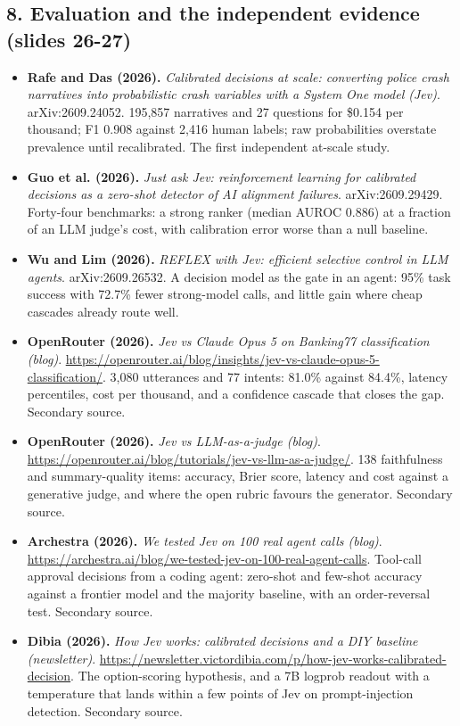 \documentclass[11pt,letterpaper]{article}
\begin{document}
\subsection*{8. Evaluation and the independent evidence (slides 26-27)}
\begin{itemize}[leftmargin=1.2em,itemsep=3pt]\sloppy
\item \textbf{Rafe and Das (2026).} \textit{Calibrated decisions at scale: converting police crash narratives into probabilistic crash variables with a System One model (Jev)}. arXiv:2609.24052. 195,857 narratives and 27 questions for \$0.154 per thousand; F1 0.908 against 2,416 human labels; raw probabilities overstate prevalence until recalibrated. The first independent at-scale study.
\item \textbf{Guo et al. (2026).} \textit{Just ask Jev: reinforcement learning for calibrated decisions as a zero-shot detector of AI alignment failures}. arXiv:2609.29429. Forty-four benchmarks: a strong ranker (median AUROC 0.886) at a fraction of an LLM judge's cost, with calibration error worse than a null baseline.
\item \textbf{Wu and Lim (2026).} \textit{REFLEX with Jev: efficient selective control in LLM agents}. arXiv:2609.26532. A decision model as the gate in an agent: 95\% task success with 72.7\% fewer strong-model calls, and little gain where cheap cascades already route well.
\item \textbf{OpenRouter (2026).} \textit{Jev vs Claude Opus 5 on Banking77 classification (blog)}. \url{https://openrouter.ai/blog/insights/jev-vs-claude-opus-5-classification/}. 3,080 utterances and 77 intents: 81.0\% against 84.4\%, latency percentiles, cost per thousand, and a confidence cascade that closes the gap. Secondary source.
\item \textbf{OpenRouter (2026).} \textit{Jev vs LLM-as-a-judge (blog)}. \url{https://openrouter.ai/blog/tutorials/jev-vs-llm-as-a-judge/}. 138 faithfulness and summary-quality items: accuracy, Brier score, latency and cost against a generative judge, and where the open rubric favours the generator. Secondary source.
\item \textbf{Archestra (2026).} \textit{We tested Jev on 100 real agent calls (blog)}. \url{https://archestra.ai/blog/we-tested-jev-on-100-real-agent-calls}. Tool-call approval decisions from a coding agent: zero-shot and few-shot accuracy against a frontier model and the majority baseline, with an order-reversal test. Secondary source.
\item \textbf{Dibia (2026).} \textit{How Jev works: calibrated decisions and a DIY baseline (newsletter)}. \url{https://newsletter.victordibia.com/p/how-jev-works-calibrated-decision}. The option-scoring hypothesis, and a 7B logprob readout with a temperature that lands within a few points of Jev on prompt-injection detection. Secondary source.

\end{itemize}
\end{document}
